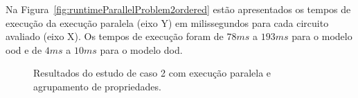 Na Figura~\ref{fig:runtimeParallelProblem2ordered} estão apresentados os tempos de execução da execução paralela (eixo Y) em milissegundos para cada circuito avaliado (eixo X).
Os tempos de execução foram de $78ms$ a $193ms$ para o modelo \ac{ood} e de $4ms$ a $10ms$ para o modelo \ac{dod}.





\begin{figure}[ht]
    \centering
    \caption{Resultados do estudo de caso 2 com execução paralela e agrupamento de propriedades.}
    \label{fig:problem2resultParallelordered}
\end{figure}


